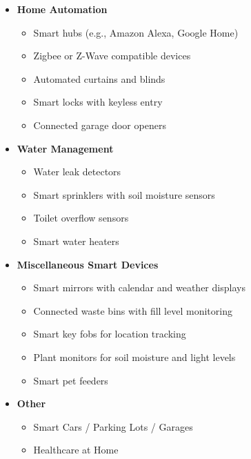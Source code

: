 \documentclass[10pt, journal]{IEEEtran} %
\begin{document}
\begin{itemize}[]
    \item{\textbf{Home Automation}}
        \begin{itemize}
            \item Smart hubs (e.g., Amazon Alexa, Google Home)
            \item Zigbee or Z-Wave compatible devices
            \item Automated curtains and blinds
            \item Smart locks with keyless entry
            \item Connected garage door openers
        \end{itemize}

    \item{\textbf{Water Management}}
        \begin{itemize}
            \item Water leak detectors
            \item Smart sprinklers with soil moisture sensors
            \item Toilet overflow sensors
            \item Smart water heaters
        \end{itemize}

    \item{\textbf{Miscellaneous Smart Devices}}
        \begin{itemize}
            \item Smart mirrors with calendar and weather displays
            \item Connected waste bins with fill level monitoring
            \item Smart key fobs for location tracking
            \item Plant monitors for soil moisture and light levels
            \item Smart pet feeders
        \end{itemize}

    \item{\textbf{Other}}
        \begin{itemize}
            \item Smart Cars / Parking Lots / Garages
            \item Healthcare at Home
        \end{itemize}

\end{itemize}



\end{document}
